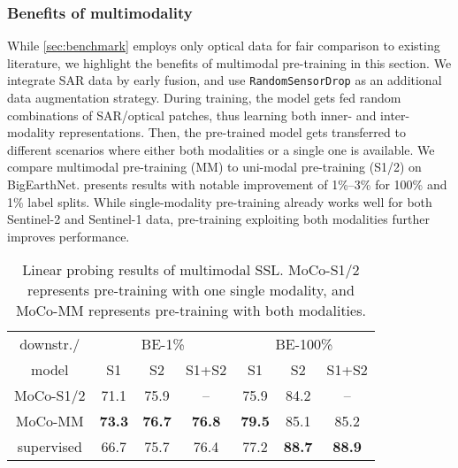 \documentclass[lettersize,journal]{IEEEtran}
\begin{document}
\subsubsection{Benefits of multimodality} While \cref{sec:benchmark} employs only optical data for fair comparison to existing literature, we highlight the benefits of multimodal pre-training in this section. We integrate SAR data by early fusion, and use \texttt{RandomSensorDrop} \citep{wang2022self} as an additional data augmentation strategy. During training, the model gets fed random combinations of SAR/optical patches, thus learning both inner- and inter-modality representations. Then, the pre-trained model gets transferred to different scenarios where either both modalities or a single one is available. We compare multimodal pre-training (MM) to uni-modal pre-training (S1/2) on BigEarthNet.  presents results with notable improvement of 1\%--3\% for 100\% and 1\% label splits. While single-modality pre-training already works well for both Sentinel-2 and Sentinel-1 data, pre-training exploiting both modalities further improves performance.
\begin{table}[h!]
\caption{Linear probing results of multimodal SSL. MoCo-S1/2 represents pre-training with one single modality, and MoCo-MM represents pre-training with both modalities.}
\label{tab:modality}
\centering
\begin{tabular}{ccccccc}
\hline
downstr./  & \multicolumn{3}{c}{BE-1\%}                  & \multicolumn{3}{c}{BE-100\%}                    \\
model      & S1            & S2            & S1+S2          & S1            & S2            & S1+S2          \\ \hline \hline
MoCo-S1/2  & 71.1          & 75.9          & --             & 75.9          & 84.2          & --            \\
MoCo-MM    & \textbf{73.3} & \textbf{76.7} & \textbf{76.8}  & \textbf{79.5} & 85.1          & 85.2          \\
supervised & 66.7          & 75.7          & 76.4           & 77.2          & \textbf{88.7} & \textbf{88.9}  \\ \hline
\end{tabular}
\end{table}
\end{document}
